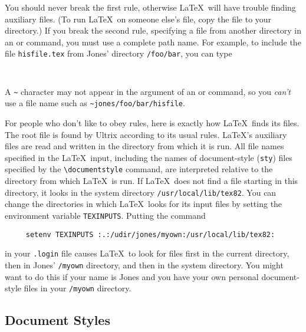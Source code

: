You should never break the first rule, otherwise \LaTeX\ will have
trouble finding auxiliary files.  (To run \LaTeX\ on someone else's
file, copy the file to your directory.) If you break the second
rule, specifying a file from another directory in an
\hbox{\verb||} or \hbox{\verb||} command, you must use a
complete path name.  For example, to include the file \mbox{\tt hisfile.tex} 
from Jones' directory \hbox{\verb|/foo/bar|}, you can type
\begin{verbatim}
     
\end{verbatim}
A \verb|~| character may not appear in the argument of an
\hbox{\verb||} or \hbox{\verb||} command, so you {\em
can't\/} use a file name such as \hbox{\verb|~jones/foo/bar/hisfile|}.

For people who don't like to obey rules, 
here is exactly how \LaTeX\ finds its
files.  The root file is found by Ultrix according to its usual rules.
\LaTeX's auxiliary files are read and written in the directory from
which it is run.  All file names specified in the \LaTeX\ input,
including the names of document-style ({\tt sty}) files specified by
the \hbox{\verb|\documentstyle|} command, are interpreted relative to
the directory from which \LaTeX\ is run.  If \LaTeX\ does not find a
file starting in this directory, it looks in the system directory
\hbox{\verb|/usr/local/lib/tex82|}.  You can change the directories in
which \LaTeX\ looks for its input files by setting the environment
variable \mbox{\tt TEXINPUTS}.  Putting the command
\begin{verbatim}
     setenv TEXINPUTS :.:/udir/jones/myown:/usr/local/lib/tex82:
\end{verbatim}
in your \mbox{\tt .login} file causes \LaTeX\ to look for files first
in the current directory, then in Jones' {\tt /myown} directory, and
then in the system directory.  You might want to do this if your name
is Jones and you have your own personal document-style files in your
{\tt /myown} directory. 

\subsection{Document Styles}


